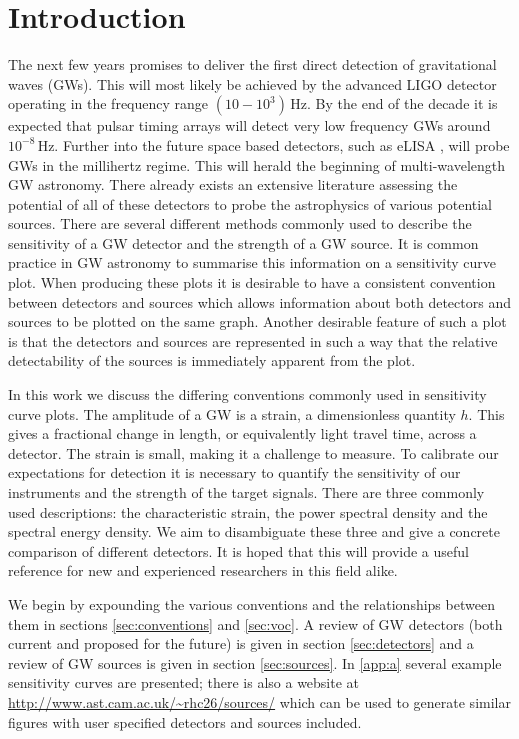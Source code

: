 \section{Introduction}

The next few years promises to deliver the first direct detection of gravitational waves (GWs). This will most likely be achieved by the advanced LIGO \citep{2010CQGra..27h4006H} detector operating in the frequency range $(10-10^{3})\,\textrm{Hz}$. By the end of the decade it is expected that pulsar timing arrays \citep{1990ApJ361300F} will detect very low frequency GWs around $10^{-8}\,\textrm{Hz}$. Further into the future space based detectors, such as eLISA \citep{2012CQGra..29l4016A}, will probe GWs in the millihertz regime. This will herald the beginning of multi-wavelength GW astronomy. There already exists an extensive literature assessing the potential of all of these detectors to probe the astrophysics of various potential sources. There are several different methods commonly used to describe the sensitivity of a GW detector and the strength of a GW source. It is common practice in GW astronomy to summarise this information on a sensitivity curve plot. When producing these plots it is desirable to have a consistent convention between detectors and sources which allows information about both detectors and sources to be plotted on the same graph. Another desirable feature of such a plot is that the detectors and sources are represented in such a way that the relative detectability of the sources is immediately apparent from the plot.

In this work we discuss the differing conventions commonly used in sensitivity curve plots. The amplitude of a GW is a strain, a dimensionless quantity $h$. This gives a fractional change in length, or equivalently light travel time, across a detector. The strain is small, making it a challenge to measure. To calibrate our expectations for detection it is necessary to quantify the sensitivity of our instruments and the strength of the target signals. There are three commonly used descriptions: the characteristic strain, the power spectral density and the spectral energy density. We aim to disambiguate these three and give a concrete comparison of different detectors. It is hoped that this will provide a useful reference for new and experienced researchers in this field alike. 

We begin by expounding the various conventions and the relationships between them in sections \ref{sec:conventions} and \ref{sec:voc}. A review of GW detectors (both current and proposed for the future) is given in section \ref{sec:detectors} and a review of GW sources is given in section \ref{sec:sources}. In \ref{app:a} several example sensitivity curves are presented; there is also a website at \url{http://www.ast.cam.ac.uk/~rhc26/sources/} which can be used to generate similar figures with user specified detectors and sources included.


